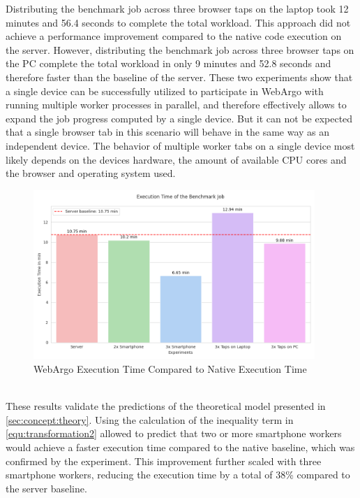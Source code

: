 Distributing the benchmark job across three browser taps on the laptop took 12 minutes and 56.4 seconds to complete the total workload. This approach did not achieve a performance improvement compared to the native code execution on the server. However, distributing the benchmark job across three browser taps on the \acs{PC} complete the total workload in only 9 minutes and 52.8 seconds and therefore faster than the baseline of the server. These two experiments show that a single device can be successfully utilized to participate in WebArgo with running multiple worker processes in parallel, and therefore effectively allows to expand the job progress computed by a single device. But it can not be expected that a single browser tab in this scenario will behave in the same way as an independent device. The behavior of multiple worker tabs on a single device most likely depends on the devices hardware, the amount of available \acs{CPU} cores and the browser and operating system used.
\begin{figure}[htbp]
    \centering
    \includegraphics[width=0.95\textwidth]{gfx/figures/Evaluation_A.png}
    \caption{WebArgo Execution Time Compared to Native Execution Time}
    \label{fig:evaluation:experiment-A}
\end{figure}
~\\
These results validate the predictions of the theoretical model presented in \autoref{sec:concept:theory}. Using the calculation of the inequality term in \eqref{equ:transformation2} allowed to predict that two or more smartphone workers would achieve a faster execution time compared to the native baseline, which was confirmed by the experiment. This improvement further scaled with three smartphone workers, reducing the execution time by a total of 38\% compared to the server baseline.

